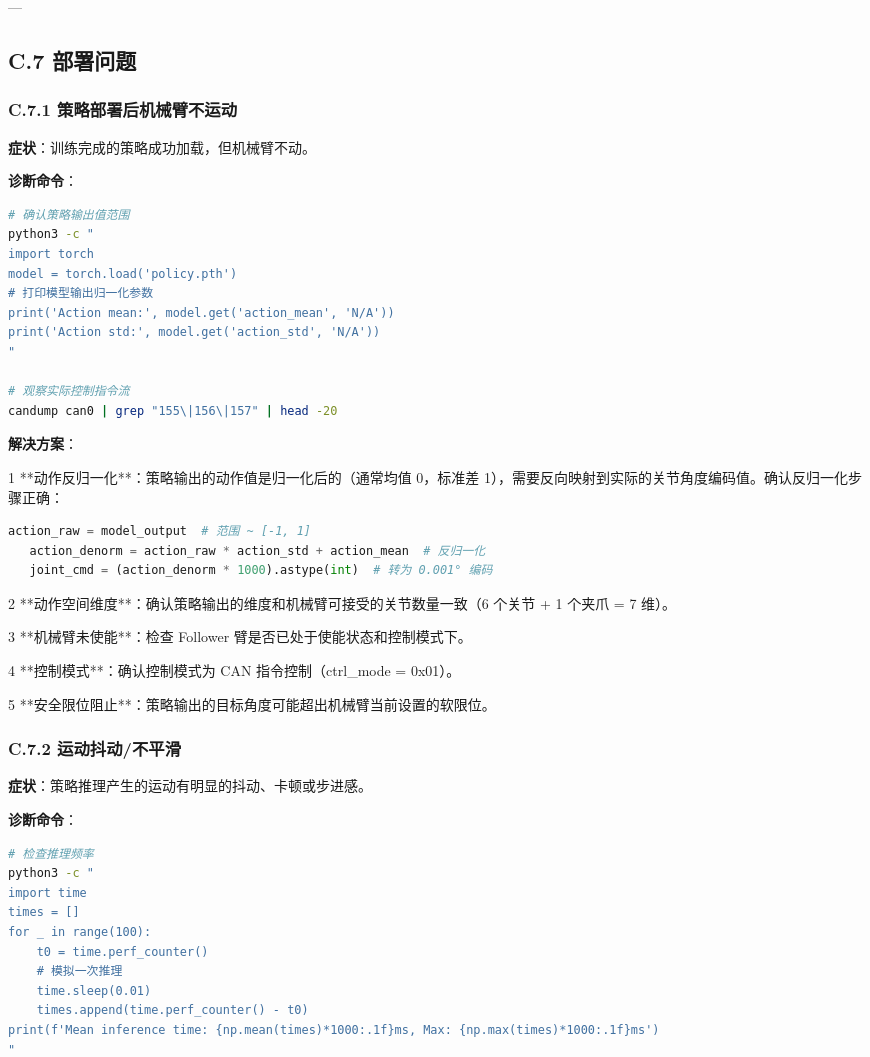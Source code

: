 \documentclass[UTF8,a4paper,11pt]{ctexart}
\begin{document}
{---

\subsection{C.7 部署问题}

\subsubsection{C.7.1 策略部署后机械臂不运动}

\textbf{症状}：训练完成的策略成功加载，但机械臂不动。

\textbf{诊断命令}：
\begin{lstlisting}[language=bash]
# 确认策略输出值范围
python3 -c "
import torch
model = torch.load('policy.pth')
# 打印模型输出归一化参数
print('Action mean:', model.get('action_mean', 'N/A'))
print('Action std:', model.get('action_std', 'N/A'))
"

# 观察实际控制指令流
candump can0 | grep "155\|156\|157" | head -20
\end{lstlisting}

\textbf{解决方案}：
\item[1] **动作反归一化**：策略输出的动作值是归一化后的（通常均值 0，标准差 1），需要反向映射到实际的关节角度编码值。确认反归一化步骤正确：
\begin{lstlisting}[language=python]
   action_raw = model_output  # 范围 ~ [-1, 1]
   action_denorm = action_raw * action_std + action_mean  # 反归一化
   joint_cmd = (action_denorm * 1000).astype(int)  # 转为 0.001° 编码
\end{lstlisting}
\item[2] **动作空间维度**：确认策略输出的维度和机械臂可接受的关节数量一致（6 个关节 + 1 个夹爪 = 7 维）。
\item[3] **机械臂未使能**：检查 Follower 臂是否已处于使能状态和控制模式下。
\item[4] **控制模式**：确认控制模式为 CAN 指令控制（ctrl_mode = 0x01）。
\item[5] **安全限位阻止**：策略输出的目标角度可能超出机械臂当前设置的软限位。

\subsubsection{C.7.2 运动抖动/不平滑}

\textbf{症状}：策略推理产生的运动有明显的抖动、卡顿或步进感。

\textbf{诊断命令}：
\begin{lstlisting}[language=bash]
# 检查推理频率
python3 -c "
import time
times = []
for _ in range(100):
    t0 = time.perf_counter()
    # 模拟一次推理
    time.sleep(0.01)
    times.append(time.perf_counter() - t0)
print(f'Mean inference time: {np.mean(times)*1000:.1f}ms, Max: {np.max(times)*1000:.1f}ms')
"
\end{lstlisting}

}
\end{document}
